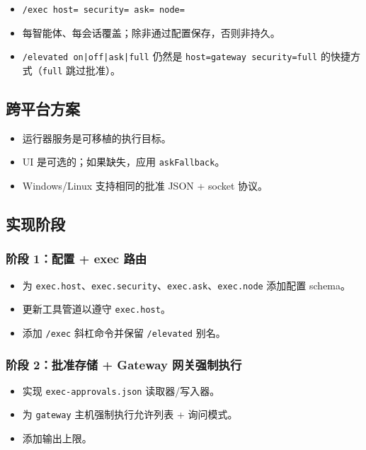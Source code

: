 \begin{itemize}
  \item \texttt{/exec host= security= ask= node=}
  \item 每智能体、每会话覆盖；除非通过配置保存，否则非持久。
  \item \texttt{/elevated on|off|ask|full} 仍然是 \texttt{host=gateway security=full} 的快捷方式（\texttt{full} 跳过批准）。
\end{itemize}


\subsection{跨平台方案}


\begin{itemize}
  \item 运行器服务是可移植的执行目标。
  \item UI 是可选的；如果缺失，应用 \texttt{askFallback}。
  \item Windows/Linux 支持相同的批准 JSON + socket 协议。
\end{itemize}


\subsection{实现阶段}


\subsubsection{阶段 1：配置 + exec 路由}


\begin{itemize}
  \item 为 \texttt{exec.host}、\texttt{exec.security}、\texttt{exec.ask}、\texttt{exec.node} 添加配置 schema。
  \item 更新工具管道以遵守 \texttt{exec.host}。
  \item 添加 \texttt{/exec} 斜杠命令并保留 \texttt{/elevated} 别名。
\end{itemize}


\subsubsection{阶段 2：批准存储 + Gateway 网关强制执行}


\begin{itemize}
  \item 实现 \texttt{exec-approvals.json} 读取器/写入器。
  \item 为 \texttt{gateway} 主机强制执行允许列表 + 询问模式。
  \item 添加输出上限。
\end{itemize}


